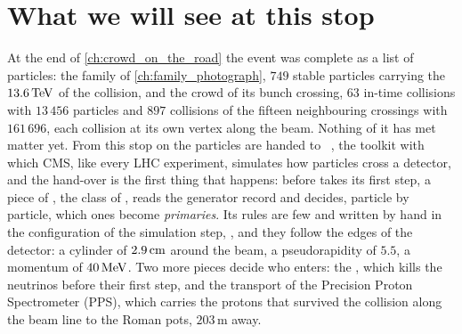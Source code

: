 
\section{What we will see at this stop}
\label{sec:crossing_the_border:what_we_compute}

At the end of \cref{ch:crowd_on_the_road} the event was complete as a list
of particles: the family of \cref{ch:family_photograph}, $749$ stable
particles carrying the $13.6\,\mathrm{TeV}$ of the collision, and the crowd of its
bunch crossing, $63$ in-time collisions with $13\,456$ particles and $897$
collisions of the fifteen neighbouring crossings with $161\,696$, each
collision at its own vertex along the beam. Nothing of it has met matter
yet. From this stop on the particles are handed to \GEANT~\cite{GEANT4:2002zbu,Allison:2006ve,Allison:2016lfl},
the toolkit with which CMS, like every LHC experiment, simulates how
particles cross a detector, and the hand-over is the first thing that
happens: before \GEANT takes its first step, a piece of \CMSSW, the class
 of , reads the
generator record and decides, particle by particle, which ones become
\GEANT \emph{primaries}. Its rules are few and written by hand in the
configuration of the simulation step, , and they
follow the edges of the detector: a cylinder of $2.9\,\mathrm{cm}$ around the beam, a
pseudorapidity of $5.5$, a momentum of $40\,\mathrm{MeV}$. Two more pieces decide who
enters: the , which kills the neutrinos before their
first step, and the transport of the Precision Proton Spectrometer (PPS),
which carries the protons that survived the collision along the beam line
to the Roman pots, $203$\,m away.

